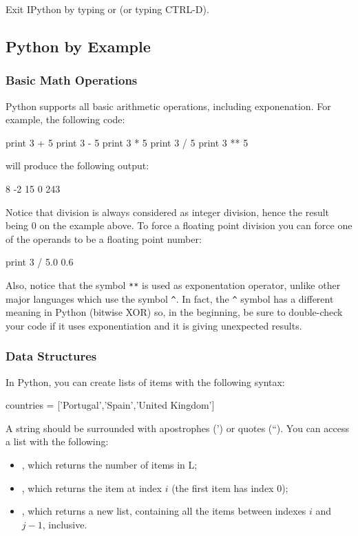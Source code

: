 Exit IPython by typing  or  (or typing CTRL-D).

\subsection{Python by Example}

\subsubsection{Basic Math Operations}

Python supports all basic arithmetic operations, including exponenation. For example, the following code:
\begin{python}
print 3 + 5
print 3 - 5
print 3 * 5
print 3 / 5
print 3 ** 5
\end{python}

\noindent will produce the following output:
\begin{python}
8
-2
15
0
243
\end{python}

Notice that division is always considered as integer division, hence the result being 0 on the example above. To force a floating point division you can force one of the operands to be a floating point number:
\begin{python}
print 3 / 5.0
0.6
\end{python}

Also, notice that the symbol \texttt{**} is used as exponentation operator, unlike other major languages which use the symbol \texttt{\^}. In fact, the \texttt{\^} symbol has a different meaning in Python (bitwise XOR) so, in the beginning, be sure to double-check your code if it uses exponentiation and it is giving unexpected results.

\subsubsection{Data Structures}

In Python, you can create lists of items with the following syntax:

\begin{python}
countries = ['Portugal','Spain','United Kingdom']
\end{python}

A string should be surrounded with apostrophes (') or quotes (``). You can access a list with
the following:

\begin{itemize}
 \item {}, which returns the number of items in L;
 \item {}, which returns the item at index $i$ (the first item has index 0);
 \item {}, which returns a new list, containing all the items between indexes $i$ and $j-1$, inclusive. 
\end{itemize}

